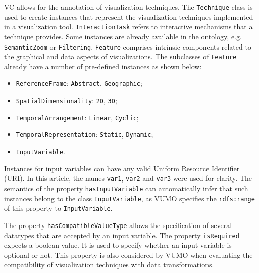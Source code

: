 \documentclass[]{interact}
\theoremstyle{plain}%
\theoremstyle{definition}
\theoremstyle{remark}
\theoremstyle{definition}
\begin{document}
VC allows for the annotation of visualization techniques. The \texttt{Technique} class is used to create instances that represent the visualization techniques implemented in a visualization tool. \texttt{InteractionTask} refers to interactive mechanisms that a technique provides. Some instances are already available in the ontology, e.g. \texttt{SemanticZoom} or \texttt{Filtering}. \texttt{Feature} comprises intrinsic components related to the graphical and data aspects of visualizations. The subclasses of \texttt{Feature} already have a number of pre-defined instances as shown below:

\begin{itemize}
\item \texttt{ReferenceFrame}: \texttt{Abstract}, \texttt{Geographic};
\item \texttt{SpatialDimensionality}: \texttt{2D}, \texttt{3D};
\item \texttt{TemporalArrangement}: \texttt{Linear}, \texttt{Cyclic};
\item \texttt{TemporalRepresentation}: \texttt{Static}, \texttt{Dynamic};
\item \texttt{InputVariable}.
\end{itemize}


Instances for input variables can have any valid Uniform Resource Identifier (URI). In this article, the names \texttt{var1}, \texttt{var2} and \texttt{var3} were used for clarity. The semantics of the property \texttt{hasInputVariable} can automatically infer that such instances belong to the class \texttt{InputVariable}, as VUMO specifies the \texttt{rdfs:range} of this property to \texttt{InputVariable}.

The property \texttt{hasCompatibleValueType} allows the specification of several datatypes that are accepted by an input variable. %
The property \texttt{isRequired} expects a boolean value. It is used to specify whether an input variable is optional or not. This property is also considered by VUMO when evaluating the compatibility of visualization techniques with data transformations.
%
\end{document}

